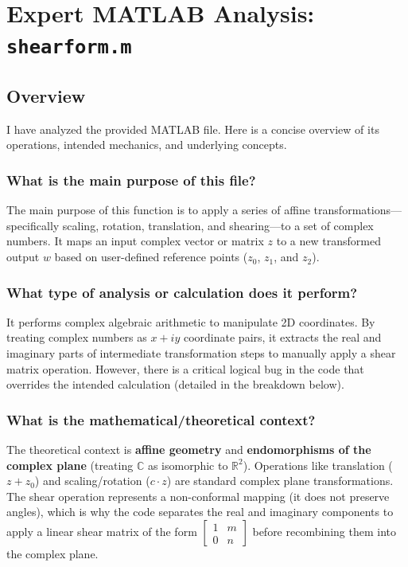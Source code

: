 
\chapter{Expert MATLAB Analysis: \texttt{shearform.m}}
\date{}

\maketitle

\section*{Overview}

I have analyzed the provided MATLAB file. Here is a concise overview of its operations, intended mechanics, and underlying concepts.

\subsection*{What is the main purpose of this file?}
The main purpose of this function is to apply a series of affine transformations—specifically scaling, rotation, translation, and shearing—to a set of complex numbers. It maps an input complex vector or matrix $z$ to a new transformed output $w$ based on user-defined reference points ($z_0$, $z_1$, and $z_2$). 

\subsection*{What type of analysis or calculation does it perform?}
It performs complex algebraic arithmetic to manipulate 2D coordinates. By treating complex numbers as $x + iy$ coordinate pairs, it extracts the real and imaginary parts of intermediate transformation steps to manually apply a shear matrix operation. However, there is a critical logical bug in the code that overrides the intended calculation (detailed in the breakdown below).

\subsection*{What is the mathematical/theoretical context?}
The theoretical context is \textbf{affine geometry} and \textbf{endomorphisms of the complex plane} (treating $\mathbb{C}$ as isomorphic to $\mathbb{R}^2$). Operations like translation ($z + z_0$) and scaling/rotation ($c \cdot z$) are standard complex plane transformations. The shear operation represents a non-conformal mapping (it does not preserve angles), which is why the code separates the real and imaginary components to apply a linear shear matrix of the form $\begin{bmatrix} 1 & m \\ 0 & n \end{bmatrix}$ before recombining them into the complex plane.

